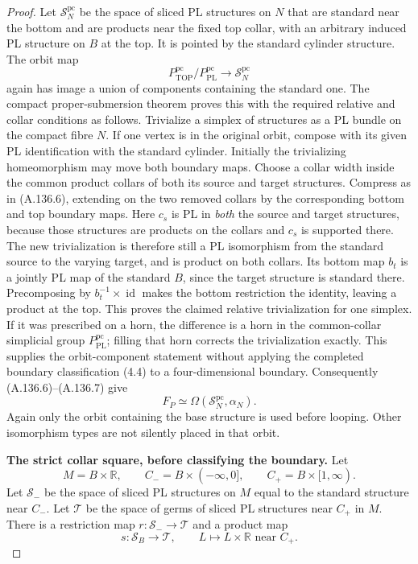 \begin{proof}
Let $\mathcal S_N^{\mathrm{pc}}$ be the space of sliced PL structures
on $N$ that are standard near the bottom and are products near the
fixed top collar, with an arbitrary induced PL structure on $B$ at the
top. It is pointed by the standard cylinder structure. The orbit map
\[
 P_{\mathrm{TOP}}^{\mathrm{pc}}/
 P_{\mathrm{PL}}^{\mathrm{pc}}
 \longrightarrow\mathcal S_N^{\mathrm{pc}}              \tag{A.136.7}
\]
again has image a union of components containing the standard one.
The compact proper-submersion theorem proves this with the required
relative and collar conditions as follows. Trivialize a simplex of
structures as a PL bundle on the compact fibre $N$. If one vertex
is in the original orbit, compose with its given PL identification
with the standard cylinder. Initially the
trivializing homeomorphism may move both boundary maps. Choose a
collar width inside the common product collars of both its source
and target structures. Compress as in (A.136.6), extending on the two
removed collars by the corresponding bottom and top boundary maps.
Here $c_s$ is PL in \emph{both} the source and target structures,
because those structures are products on the collars and $c_s$ is
supported there. The new trivialization is therefore still a PL
isomorphism from the standard source to the varying target, and is
product on both collars. Its bottom map $b_t$ is a jointly PL map
of the standard $B$, since the target structure is standard there.
Precomposing by $b_t^{-1}\times\operatorname{id}$ makes the bottom
restriction the identity, leaving a product at the top.
This proves the claimed relative trivialization for one simplex.
If it was prescribed on a horn, the difference is a horn in the
common-collar simplicial group $P_{\mathrm{PL}}^{\mathrm{pc}}$;
filling that horn corrects the trivialization exactly. This supplies
the orbit-component statement without applying the completed
boundary classification (4.4) to a four-dimensional boundary.
Consequently (A.136.6)--(A.136.7) give
\[
 F_P\simeq\Omega(\mathcal S_N^{\mathrm{pc}},\alpha_N).
                                                        \tag{A.136.8}
\]
Again only the orbit containing the base structure is used before
looping. Other isomorphism types are not silently placed in that orbit.

\textbf{The strict collar square, before classifying the boundary.}
Let
\[
 M=B\times\mathbb R,\qquad
 C_-=B\times(-\infty,0],\qquad C_+=B\times[1,\infty).
\]
Let $\mathcal S_-$ be the space of sliced PL structures on $M$ equal
to the standard structure near $C_-$. Let $\mathcal T$ be the space
of germs of sliced PL structures near $C_+$ in $M$. There is a
restriction map $r:\mathcal S_-\to\mathcal T$ and a product map
\[
 s:\mathcal S_B\longrightarrow\mathcal T,
 \qquad L\longmapsto L\times\mathbb R\text{ near }C_+.
\]


\end{proof}
